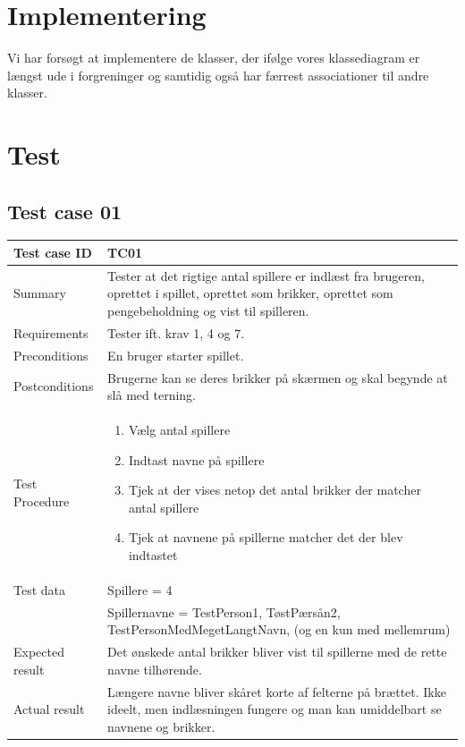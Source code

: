 \documentclass{article}
\begin{document}
\section{Implementering}
Vi har forsøgt at implementere de klasser, der ifølge vores klassediagram er længst ude i forgreninger og samtidig også har færrest associationer til andre klasser.

\section{Test}
\subsection{Test case 01}
\begin{tabular}{ | m{} | m{}|}
    \hline
    Test case ID & TC01  \\
    \hline
    Summary & Tester at det rigtige antal spillere er indlæst fra brugeren, oprettet i spillet, oprettet som brikker, oprettet som pengebeholdning og vist til spilleren.\\
    \hline
    Requirements & Tester ift. krav 1, 4 og 7.\\
    \hline
    Preconditions & En bruger starter spillet.\\
    \hline
    Postconditions & Brugerne kan se deres brikker på skærmen og skal begynde at slå med terning.\\
    \hline
    Test Procedure & \begin{enumerate}[itemsep=0.1mm]
        \item Vælg antal spillere
        \item Indtast navne på spillere
        \item Tjek at der vises netop det antal brikker der matcher antal spillere
        \item Tjek at navnene på spillerne matcher det der blev indtastet
    \end{enumerate}\\
    \hline
    Test data &  Spillere = 4\\
     & Spillernavne = TestPerson1, TøstPærsån2, TestPersonMedMegetLangtNavn, (og en kun med mellemrum)\\
    \hline
    Expected result & Det ønskede antal brikker bliver vist til spillerne med de rette navne tilhørende.\\
    \hline
    Actual result & Længere navne bliver skåret korte af felterne på brættet. Ikke ideelt, men indlæsningen fungere og man kan umiddelbart se navnene og brikker.\\

\end{tabular}
\end{document}
